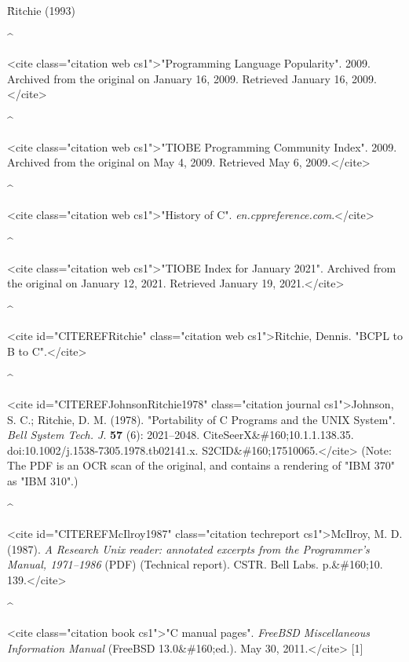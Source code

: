 \documentclass{article}\usepackage{titlesec}
\begin{document}
\item\^      Ritchie (1993)

\item\textbf{\^} \item<cite class="citation web cs1">"Programming Language Popularity". 2009. Archived from the original on January 16, 2009. Retrieved January 16, 2009.</cite>

\item\textbf{\^} \item<cite class="citation web cs1">"TIOBE Programming Community Index". 2009. Archived from the original on May 4, 2009. Retrieved May 6, 2009.</cite>

\item\^   \item<cite class="citation web cs1">"History of C". \emph{en.cppreference.com}.</cite>

\item\textbf{\^} \item<cite class="citation web cs1">"TIOBE Index for January 2021". Archived from the original on January 12, 2021. Retrieved January 19, 2021.</cite>

\item\textbf{\^} \item<cite id="CITEREFRitchie" class="citation web cs1">Ritchie, Dennis. "BCPL to B to C".</cite>

\item\^   \item<cite id="CITEREFJohnsonRitchie1978" class="citation journal cs1">Johnson, S. C.; Ritchie, D. M. (1978). "Portability of C Programs and the UNIX System". \emph{Bell System Tech. J}. \textbf{57} (6): 2021–2048. CiteSeerX&\#160;10.1.1.138.35. doi:10.1002/j.1538-7305.1978.tb02141.x. S2CID&\#160;17510065.</cite> (Note: The PDF is an OCR scan of the original, and contains a rendering of "IBM 370" as "IBM 310".)

\item\textbf{\^} \item<cite id="CITEREFMcIlroy1987" class="citation techreport cs1">McIlroy, M. D. (1987). \emph{A Research Unix reader: annotated excerpts from the Programmer's Manual, 1971–1986} (PDF) (Technical report). CSTR. Bell Labs. p.&\#160;10. 139.</cite>

\item\textbf{\^} \item<cite class="citation book cs1">"C manual pages". \emph{FreeBSD Miscellaneous Information Manual} (FreeBSD 13.0&\#160;ed.). May 30, 2011.</cite> [1]
\end{document}
